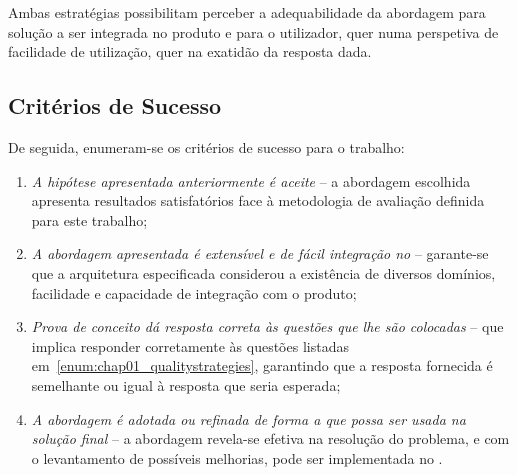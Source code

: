 Ambas estratégias possibilitam perceber a adequabilidade da abordagem para solução a ser integrada no produto e para o utilizador, quer numa perspetiva de facilidade de utilização, quer na exatidão da resposta dada.

\subsection{Critérios de Sucesso}
De seguida, enumeram-se os critérios de sucesso para o trabalho:

\begin{enumerate}
    \item 
    {
        \textit{A hipótese apresentada anteriormente é aceite} -- a abordagem escolhida apresenta resultados satisfatórios face à metodologia de avaliação definida para este trabalho;
    }
    \item
    {
        \textit{A abordagem apresentada é extensível e de fácil integração no {\productname}} -- garante-se que a arquitetura especificada considerou a existência de diversos domínios, facilidade e capacidade de integração com o produto;
    }
    \item
    {
        \textit{Prova de conceito dá resposta correta às questões que lhe são colocadas} -- que implica responder corretamente às questões listadas em~\ref{enum:chap01_qualitystrategies}, garantindo que a resposta fornecida é semelhante ou igual à resposta que seria esperada;
    }
    \item
    {
        \textit{A abordagem é adotada ou refinada de forma a que possa ser usada na solução final} -- a abordagem revela-se efetiva na resolução do problema, e com o levantamento de possíveis melhorias, pode ser implementada no {\productname}.
    }
\end{enumerate}